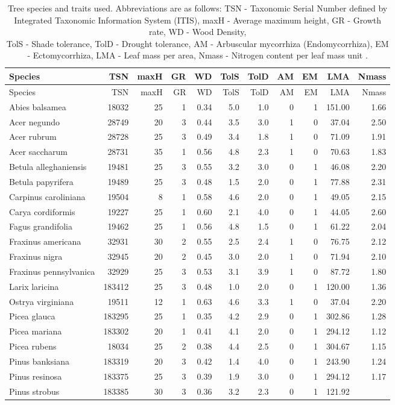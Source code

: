 \begin{longtable}[]{@{}lrrrrrrrrrr@{}}
\caption{Tree species and traits used. Abbreviations are as follows: TSN
- Taxonomic Serial Number defined by Integrated Taxonomic Information
System (ITIS), maxH - Average maximum height, GR - Growth rate, WD -
Wood Density,\\
TolS - Shade tolerance, TolD - Drought tolerance, AM - Arbuscular
mycorrhiza (Endomycorrhiza), EM - Ectomycorrhiza, LMA - Leaf mass per
area, Nmass - Nitrogen content per leaf mass unit \citep{Paquette2011}.
\label{tbl:trees}}\tabularnewline
\toprule
Species & TSN & maxH & GR & WD & TolS & TolD & AM & EM & LMA &
Nmass\tabularnewline
\midrule
\endfirsthead
\toprule
Species & TSN & maxH & GR & WD & TolS & TolD & AM & EM & LMA &
Nmass\tabularnewline
\midrule
\endhead
Abies balsamea & 18032 & 25 & 1 & 0.34 & 5.0 & 1.0 & 0 & 1 & 151.00 &
1.66\tabularnewline
Acer negundo & 28749 & 20 & 3 & 0.44 & 3.5 & 3.0 & 1 & 0 & 37.04 &
2.50\tabularnewline
Acer rubrum & 28728 & 25 & 3 & 0.49 & 3.4 & 1.8 & 1 & 0 & 71.09 &
1.91\tabularnewline
Acer saccharum & 28731 & 35 & 1 & 0.56 & 4.8 & 2.3 & 1 & 0 & 70.63 &
1.83\tabularnewline
Betula alleghaniensis & 19481 & 25 & 3 & 0.55 & 3.2 & 3.0 & 0 & 1 &
46.08 & 2.20\tabularnewline
Betula papyrifera & 19489 & 25 & 3 & 0.48 & 1.5 & 2.0 & 0 & 1 & 77.88 &
2.31\tabularnewline
Carpinus caroliniana & 19504 & 8 & 1 & 0.58 & 4.6 & 2.0 & 0 & 1 & 49.05
& 2.15\tabularnewline
Carya cordiformis & 19227 & 25 & 1 & 0.60 & 2.1 & 4.0 & 0 & 1 & 44.05 &
2.60\tabularnewline
Fagus grandifolia & 19462 & 25 & 1 & 0.56 & 4.8 & 1.5 & 0 & 1 & 61.22 &
2.04\tabularnewline
Fraxinus americana & 32931 & 30 & 2 & 0.55 & 2.5 & 2.4 & 1 & 0 & 76.75 &
2.12\tabularnewline
Fraxinus nigra & 32945 & 20 & 2 & 0.45 & 3.0 & 2.0 & 1 & 0 & 71.94 &
2.10\tabularnewline
Fraxinus pennsylvanica & 32929 & 25 & 3 & 0.53 & 3.1 & 3.9 & 1 & 0 &
87.72 & 1.80\tabularnewline
Larix laricina & 183412 & 25 & 3 & 0.48 & 1.0 & 2.0 & 0 & 1 & 120.00 &
1.36\tabularnewline
Ostrya virginiana & 19511 & 12 & 1 & 0.63 & 4.6 & 3.3 & 1 & 0 & 37.04 &
2.20\tabularnewline
Picea glauca & 183295 & 25 & 1 & 0.35 & 4.2 & 2.9 & 0 & 1 & 302.86 &
1.28\tabularnewline
Picea mariana & 183302 & 20 & 1 & 0.41 & 4.1 & 2.0 & 0 & 1 & 294.12 &
1.12\tabularnewline
Picea rubens & 18034 & 25 & 2 & 0.38 & 4.4 & 2.5 & 0 & 1 & 304.67 &
1.15\tabularnewline
Pinus banksiana & 183319 & 20 & 3 & 0.42 & 1.4 & 4.0 & 0 & 1 & 243.90 &
1.24\tabularnewline
Pinus resinosa & 183375 & 25 & 3 & 0.39 & 1.9 & 3.0 & 0 & 1 & 294.12 &
1.17\tabularnewline
Pinus strobus & 183385 & 30 & 3 & 0.36 & 3.2 & 2.3 & 0 & 1 & 121.92 &

\end{longtable}
